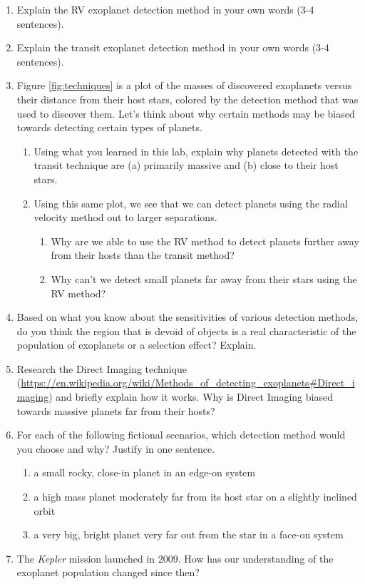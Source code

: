 \documentclass[11pt]{article}%
\begin{document}
\begin{enumerate}
    \item Explain the RV exoplanet detection method in your own words (3-4 sentences).
    \item Explain the transit exoplanet detection method in your own words (3-4 sentences).
    \item Figure \ref{fig:techniques} is a plot of the masses of discovered exoplanets versus their distance from their host stars, colored by the detection method that was used to discover them. Let's think about why certain methods may be biased towards detecting certain types of planets.
    \begin{enumerate}
        \item Using what you learned in this lab, explain why planets detected with the transit technique are (a) primarily massive and (b) close to their host stars. %
        \item Using this same plot, we see that we can detect planets using the radial velocity method out to larger separations.
        \begin{enumerate}
            \item Why are we able to use the RV method to detect planets further away from their hosts than the transit method? %
            \item Why can't we detect small planets far away from their stars using the RV method? %
        \end{enumerate}
    \end{enumerate}
    \item Based on what you know about the sensitivities of various detection methods, do you think the region that is devoid of objects is a real characteristic of the population of exoplanets or a selection effect? Explain.
    \item Research the Direct Imaging technique (\url{https://en.wikipedia.org/wiki/Methods_of_detecting_exoplanets#Direct_imaging}) and briefly explain how it works.  Why is Direct Imaging biased towards massive planets far from their hosts?
    \item For each of the following fictional scenarios, which detection method would you choose and why? Justify in one sentence.
    \begin{enumerate}
        \item a small rocky, close-in planet in an edge-on system %
        \item a high mass planet moderately far from its host star on a slightly inclined orbit %
        \item a very big, bright planet very far out from the star in a face-on system %
    \end{enumerate}
    \item The \textit{Kepler} mission launched in 2009. How has our understanding of the exoplanet population changed since then?
   
\end{enumerate}
\end{document}

